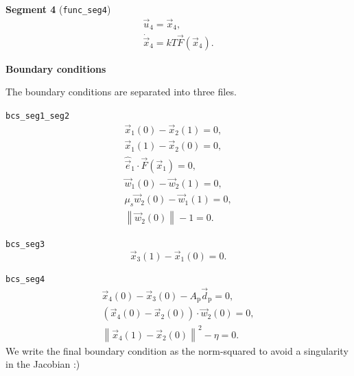 \documentclass[11pt]{article}
\begin{document}
\textbf{Segment 4} (\verb!func_seg4!)
\begin{subequations}
  \begin{gather}
    \vec{u}_{4} = \vec{x}_{4} , \\
    \dot{\vec{x}}_{4} = k T \vec{F} (\vec{x}_{4}) .
  \end{gather}
\end{subequations}

\textbf{Boundary conditions}

The boundary conditions are separated into three files.

\verb!bcs_seg1_seg2!
\begin{subequations}
  \begin{gather}
    \vec{x}_{1}(0) - \vec{x}_{2}(1) = 0 , \\
    \vec{x}_{1}(1) - \vec{x}_{2}(0) = 0 , \\
    \hat{\vec{e}}_{1} \cdot \vec{F} (\vec{x}_{1}) = 0, \\
    \vec{w}_{1}(0) - \vec{w}_{2}(1) = 0 , \\
    \mu_{s} \vec{w}_{2}(0) - \vec{w}_{1}(1) = 0 , \\
    \left\| \vec{w}_{2}(0) \right\| - 1 = 0 .
  \end{gather}
\end{subequations}

\verb!bcs_seg3!
\begin{equation}
  \vec{x}_{3}(1) - \vec{x}_{1}(0) = 0 .
\end{equation}

\verb!bcs_seg4!
\begin{subequations}
  \begin{gather}
    \vec{x}_{4}(0) - \vec{x}_{3}(0) - A_{\mathrm{p}} \vec{d}_{\mathrm{p}} = 0 , \\
      \left( \vec{x}_{4}(0) - \vec{x}_{2}(0) \right) \cdot \vec{w}_{2}(0) = 0 , \\
      \left\| \vec{x}_{4}(1) - \vec{x}_{2}(0) \right\|^{2} - \eta = 0.
  \end{gather}
\end{subequations}
We write the final boundary condition as the norm-squared to avoid a singularity in the Jacobian :)
\end{document}
